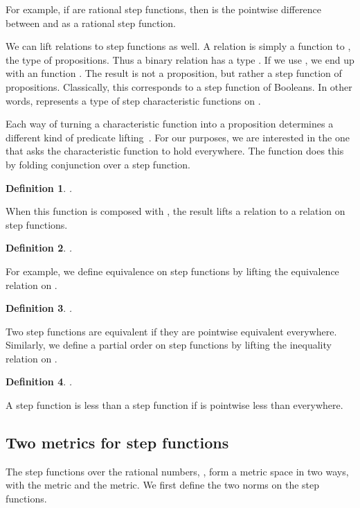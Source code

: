 \documentclass{elsarticle}
\newcommand{\tmtextsf}[1]{{\sffamily{#1}}}
\newtheorem{definition}{Definition}
\begin{document}
For example, if  are rational step functions, then  is the pointwise difference between  and  as a
rational step function.

We can lift relations to step functions as well. A relation is simply a
function to , the type of propositions. Thus a binary relation
 has a type . If we use , we end up
with an function . The result is not a proposition, but rather a
step function of propositions. Classically, this corresponds to a step
function of Booleans. In other words,  represents a type of step
characteristic functions on .

Each way of turning a characteristic function into a proposition determines a
different kind of predicate lifting~{\cite{Schroder:2005}}. For our purposes,
we are interested in the one that asks the characteristic function to hold
everywhere. The function  does this by folding conjunction over a step
function.

\begin{definition}
  .
\end{definition}

When this function is composed with \tmtextsf{map2}, the result lifts a
relation to a relation on step functions.

\begin{definition}
  .
\end{definition}

For example, we define equivalence on step functions by lifting the
equivalence relation on .

\begin{definition}
  .
\end{definition}

Two step functions are equivalent if they are pointwise equivalent everywhere.
Similarly, we define a partial order on step functions by lifting the
inequality relation on .

\begin{definition}
  .
\end{definition}

A step function  is less than a step function  if  is pointwise less
than  everywhere.

\subsection{Two metrics for step functions}\label{metric-step}The step
functions over the rational numbers, , form a metric space in
two ways, with the  metric
and the  metric. We first define the two
norms on the step functions.
\end{document}

